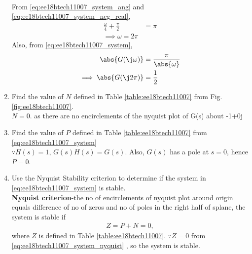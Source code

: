 \begin{enumerate}[label=\thesection.\arabic*.,ref=\thesection.\theenumi]
\begin{align}
\label{eq:ee18btech11007_system_ang}
\end{align}
From \eqref{eq:ee18btech11007_system_ang} and \eqref{eq:ee18btech11007_system_neg_real}, 
\begin{align}
\frac{\omega}{4}+\frac{\pi}{2} &= \pi
\\
\implies \omega = 2\pi
\end{align}
Also, from \eqref{eq:ee18btech11007_system},
\begin{align}
\label{eq:ee18btech11007_system_mod}
\abs{ G(\j\omega)}&=\frac{\pi }{\abs{\omega}}
\\
\implies \abs{ G(\j2\pi)} &= \frac{1}{2}
\end{align}
\begin{table}[!ht]
\centering

\caption{}
\label{table:ee18btech11007}
\end{table}
%

\item Find the value of $N$ defined in Table \ref{table:ee18btech11007} from Fig.  \ref{fig:ee18btech11007}.
%
\\
\solution $N = 0$. as there are no encirclements of the nyquist plot of G(s) about -1+0j
\item Find the value of $P$ defined in Table \ref{table:ee18btech11007} from  \eqref{eq:ee18btech11007_system}
\\
\solution $\because H(s) = 1$, $G(s)H(s) = G(s)$. Also, $G(s)$ has a pole at $s = 0$, hence $P = 0$.
\item Use the Nyquist Stability criterion to determine if the system in \ref{eq:ee18btech11007_system} is stable.
\\
\solution \textbf{Nyquist criterion}-the no of encirclements of nyquist plot around origin equals difference of no of zeros and no of poles in the right half of splane, the system is stable if
\begin{align}
\label{eq:ee18btech11007_system_nyquist}
Z = P+N = 0,    
\end{align}
%
where $Z$ is defined in Table \ref{table:ee18btech11007}.   
$\because Z = 0$ from \ref{eq:ee18btech11007_system_nyquist}
,  so the system is stable.
%


\end{enumerate}
